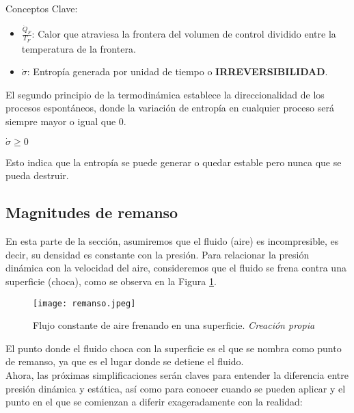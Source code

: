 Conceptos Clave:
\begin{itemize}
    \item \(\frac{\dot{Q}_F}{T_F}\): Calor que atraviesa la frontera  del volumen de control dividido entre la temperatura de la frontera.
    \item \(\dot{\sigma}\): Entropía generada por unidad de tiempo o \textbf{IRREVERSIBILIDAD}.
\end{itemize}

El segundo principio de la termodinámica establece la direccionalidad de los procesos espontáneos, donde la variación de entropía en cualquier proceso será siempre mayor o igual que 0.

\begin{tcolorbox}[colframe=red,colback=white,arc=2mm]
\centering
\(\dot{\sigma} \geq 0\)
\end{tcolorbox}

Esto indica que la entropía se puede generar o quedar estable pero nunca que se pueda destruir.

\subsection{Magnitudes de remanso} \label{subsec:magnitudesderemanso}

En esta parte de la sección, asumiremos que el fluido (aire) es incompresible, es decir, su densidad es constante con la presión. Para relacionar la presión dinámica con la velocidad del aire, consideremos que el fluido se frena contra una superficie (choca), como se observa en la Figura \ref{fig:presiondinamica}.

\begin{figure}[H] 
    \centering
    \texttt{[image: remanso.jpeg]}
    \caption{\centering Flujo constante de aire frenando en una superficie. \textit{Creación propia}}
    \label{fig:presiondinamica}
\end{figure}

El punto donde el fluido choca con la superficie es el que se nombra como punto de remanso, ya que es el lugar donde se detiene el fluido.\\ 

Ahora, las próximas simplificaciones serán claves para entender la diferencia entre presión dinámica y estática, así como para conocer cuando se pueden aplicar y el punto en el que se comienzan a diferir exageradamente con la realidad:

